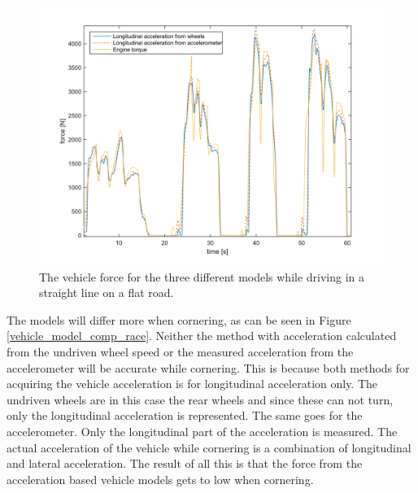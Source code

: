 \begin{figure}[h]
	\centering
	\includegraphics[width=1\textwidth]{Pictures/vehicle_model_comp_olikaacc}
	\caption{The vehicle force for the three different models while driving in a straight line on a flat road.}
	\label{vehicle_model_comp_olikaacc}
\end{figure}

The models will differ more when cornering, as can be seen in Figure \ref{vehicle_model_comp_race}. Neither the method with acceleration calculated from the undriven wheel speed or the measured acceleration from the accelerometer will be accurate while cornering. This is because both methods for acquiring the vehicle acceleration is for longitudinal acceleration only. The undriven wheels are in this case the rear wheels and since these can not turn, only the longitudinal acceleration is represented. The same goes for the accelerometer. Only the longitudinal part of the acceleration is measured. The actual acceleration of the vehicle while cornering is a combination of longitudinal and lateral acceleration. The result of all this is that the force from the acceleration based vehicle models gets to low when cornering. 

